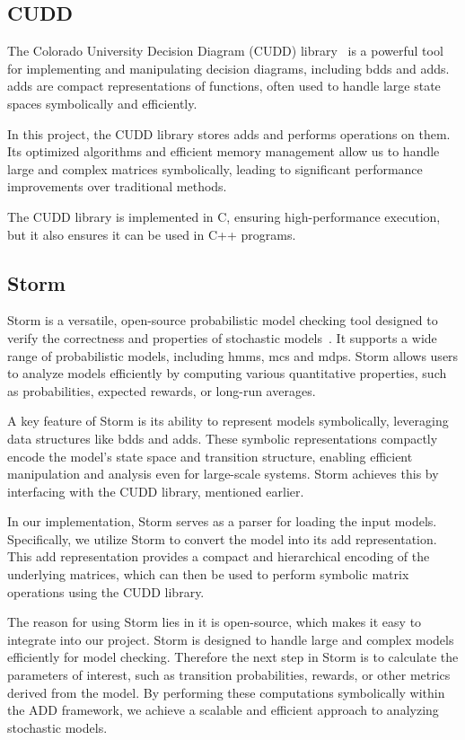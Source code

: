 \subsection{CUDD}\label{subsec:cudd}
The Colorado University Decision Diagram (CUDD) library~\cite{somenzi1997cudd} is a powerful tool for implementing and manipulating decision diagrams, including \glspl{bdd} and \glspl{add}. \glspl{add} are compact representations of functions, often used to handle large state spaces symbolically and efficiently.

In this project, the CUDD library stores \glspl{add} and performs operations on them.
Its optimized algorithms and efficient memory management allow us to handle large and complex matrices symbolically, leading to significant performance improvements over traditional methods.

The CUDD library is implemented in C, ensuring high-performance execution, but it also ensures it can be used in C++ programs.

\subsection{Storm}\label{subsec:storm}
Storm is a versatile, open-source probabilistic model checking tool designed to verify the correctness and properties of stochastic models~\cite{hensel2021probabilistic}. It supports a wide range of probabilistic models, including \glspl{hmm}, \glspl{mc} and \glspl{mdp}. Storm allows users to analyze models efficiently by computing various quantitative properties, such as probabilities, expected rewards, or long-run averages.

A key feature of Storm is its ability to represent models symbolically, leveraging data structures like \glspl{bdd} and \glspl{add}. These symbolic representations compactly encode the model's state space and transition structure, enabling efficient manipulation and analysis even for large-scale systems. Storm achieves this by interfacing with the CUDD library, mentioned earlier.

In our implementation, Storm serves as a parser for loading the input models. Specifically, we utilize Storm to convert the model into its \gls{add} representation. This \gls{add} representation provides a compact and hierarchical encoding of the underlying matrices, which can then be used to perform symbolic matrix operations using the CUDD library.

The reason for using Storm lies in it is open-source, which makes it easy to integrate into our project. Storm is designed to handle large and complex models efficiently for model checking.
Therefore the next step in Storm is to calculate the parameters of interest, such as transition probabilities, rewards, or other metrics derived from the model. By performing these computations symbolically within the ADD framework, we achieve a scalable and efficient approach to analyzing stochastic models.


